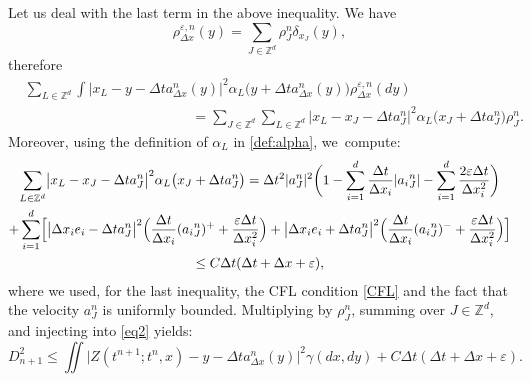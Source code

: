 \documentclass[JEP,XML,SOM,Unicode, NoFloatCountersInSection,published]{cedram}
\def\ZZ{\mathbb{Z}}
\def\eps{\varepsilon}
\def\dt{\Delta t}
\def\dx{\Delta x}
\theoremstyle{plain}
\theoremstyle{definition}
\begin{document}
Let us deal with the last term in the above inequality.
We have\vspace*{-3pt}
\[
\rho_{\dx}^{\eps,n}(y) = \sum_{J\in\ZZ^d} \rho_J^n \delta_{x_J}(y),
\]
therefore\vspace*{-3pt}
\begin{align*}
&\sum_{L\in \ZZ^d} \int \bigl|x_L-y-\dt a^n_{\dx}(y)\bigr|^2 \alpha_L\bigl(y+\dt a^n_{\dx}(y)\bigr) \rho_{\dx}^{\eps,n}(dy) \\[-5pt]
&\hspace{5cm} = \sum_{J\in \ZZ^d} \sum_{L\in \ZZ^d} \bigl|x_L-x_J-\dt a^n_J\bigr|^2 \alpha_L\bigl(x_J+\dt a^n_J\bigr) \rho_J^n.
\end{align*}
Moreover, using the definition of $\alpha_L$ in \eqref{def:alpha}, we~compute:\vspace*{-5pt}
\begin{multline*}
\sum_{L\in \ZZ^d} \bigl|x_L-x_J-\dt a^n_J\bigr|^2 \alpha_L\bigl(x_J+\dt a^n_J\bigr)
= \dt^2 |a_J^n|^2 \biggl(1-\sum_{i=1}^d \frac{\dt}{\dx_i} |{a_i}_J^n| - \sum_{i=1}^d \frac{2\eps\dt}{\dx_i^2}\biggr) \\
+ \sum_{i=1}^d \Bigl[ \bigl|\dx_i e_i -\dt a^n_J\bigr|^2 \Big(\frac{\dt}{\dx_i} ({a_i}_J^n)^+ + \frac{\eps\dt}{\dx_i^2}\Big)+
\bigl|\dx_i e_i +\dt a^n_J\bigr|^2 \Big(\frac{\dt}{\dx_i} ({a_i}_J^n)^- + \frac{\eps\dt}{\dx_i^2}\Big) \Bigr] \\
\leq C\dt(\dt + \dx + \eps),
\end{multline*}
where we used, for the last inequality, the CFL condition \eqref{CFL} and the fact that the velocity $a_J^n$ is uniformly bounded. Multiplying by $\rho_J^n$, summing over $J \in \ZZ^d$, and injecting into \eqref{eq2} yields:
\begin{equation}\label{eqD1}
D_{n+1}^2 \leq \iint \bigl|Z(t^{n+1};t^n,x)-y-\dt a^n_{\dx}(y)\bigr|^2 \gamma(dx,dy) + C \dt (\dt+\dx+\eps).
\end{equation}
\end{document}
